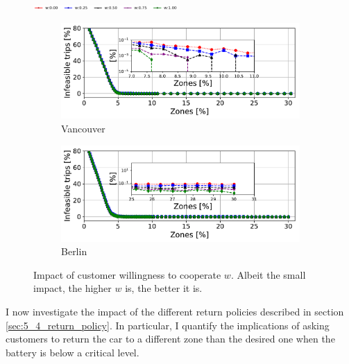 \begin{figure}[t!]
  \begin{center}
	 \includegraphics[width=0.49\textwidth]{figures/legenda.pdf}
  \vspace{-1cm}
  \end{center}
    \begin{center}
         \begin{subfigure}{0.49\textwidth}
             \includegraphics[width=\columnwidth]{figures/cut_Vancouver_DeathsVsZones_Policy_44_tt-25_100_4.pdf}
             \caption{Vancouver}
             \label{fig:6_7_zone_vs_deaths_vancouver_willingness}
         \end{subfigure}         
         \begin{subfigure}{0.49\textwidth}
             \includegraphics[width=\columnwidth]{figures/cut_Berlino_DeathsVsZones_Policy_44_tt-25_100_4.pdf}
             \caption{Berlin}
             \label{fig:6_7_zone_vs_deaths_berlino_willingness}
         \end{subfigure}
         \caption{Impact of customer willingness to cooperate $w$. Albeit the small impact, the higher $w$ is, the better it is.}
         \label{fig:6_7_zone_vs_deaths_willingness}
\end{center}
\end{figure}
I now investigate the impact of the different return policies described in section \ref{sec:5_4_return_policy}. In particular, I quantify the implications of asking customers to return the car to a different zone than the desired one when the battery is below a critical level.


